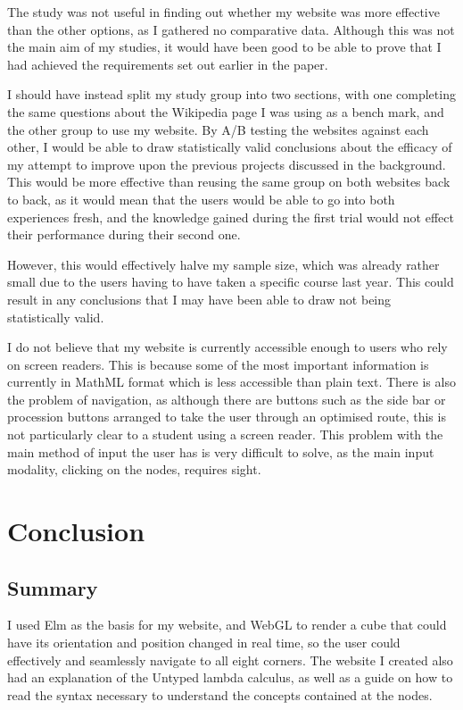 \documentclass{l4proj}
\begin{document}
The study was not useful in finding out whether my website was more effective than the other options, as I gathered no comparative data.  Although this was not the main aim of my studies, it would have been good to be able to prove that I had achieved the requirements set out earlier in the paper.

I should have instead split my study group into two sections, with one completing the same questions about the Wikipedia page I was using as a bench mark, and the other group to use my website.  By A/B testing the websites against each other, I would be able to draw statistically valid conclusions about the efficacy of my attempt to improve upon the previous projects discussed in the background.  This would be more effective than reusing the same group on both websites back to back, as it would mean that the users would be able to go into both experiences fresh, and the knowledge gained during the first trial would not effect their performance during their second one. 

However, this would effectively halve my sample size, which was already rather small due to the users having to have taken a specific course last year. This could result in any conclusions that I may have been able to draw not being statistically valid.

I do not believe that my website is currently accessible enough to users who rely on screen readers.  This is because some of the most important information is currently in MathML format which is less accessible than plain text.  There is also the problem of navigation, as although there are buttons such as the side bar or procession buttons arranged to take the user through an optimised route, this is not particularly clear to a student using a screen reader.  This problem with the main method of input the user has is very difficult to solve, as the main input modality, clicking on the nodes, requires sight.

\chapter{Conclusion}    

\section{Summary}

I used Elm as the basis for my website, and WebGL to render a cube that could have its orientation and position changed in real time, so the user could effectively and seamlessly navigate to all eight corners. The website I created also had an explanation of the Untyped lambda calculus, as well as a guide on how to read the syntax necessary to understand the concepts contained at the nodes.
\end{document}
